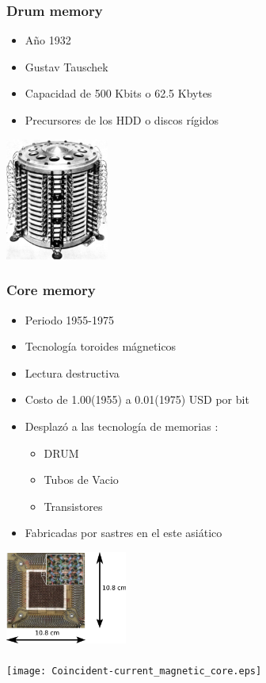 \documentclass{beamer}
\begin{document}
\begin{frame}
\frametitle{Drum memory}
	\begin{minipage}[b]{7.5cm}
		\begin{itemize}
			\item Año 1932
			\item Gustav Tauschek
			\item Capacidad de 500 Kbits o 62.5 Kbytes
			\item Precursores de los HDD o discos rígidos
		\end{itemize}
	\end{minipage}
	\begin{minipage}[c]{4cm}
		\begin{center}
			\includegraphics[height=4cm]{Pamiec_bebnowa_1.jpg}
		\end{center}
	\end{minipage}
\end{frame}

\begin{frame}
\frametitle{Core memory}
	\begin{minipage}[c]{7.5cm}
		\begin{itemize}
			\item Periodo 1955-1975
			\item Tecnología toroides mágneticos
			\item Lectura destructiva
			\item Costo de 1.00(1955) a 0.01(1975) USD por bit
			\item Desplazó a las tecnología de memorias :
				\begin{itemize}
				\item DRUM
					\item Tubos de Vacio
					\item Transistores
				\end{itemize}
			\item Fabricadas por sastres en el este asiático
		\end{itemize}
	\end{minipage}
	\begin{minipage}[c]{4cm}
		\includegraphics[width=4cm]{Ferrite_core_memory.eps} \\ \\
		\texttt{[image: Coincident-current\_magnetic\_core.eps]}
	\end{minipage}
\end{frame}
\end{document}
